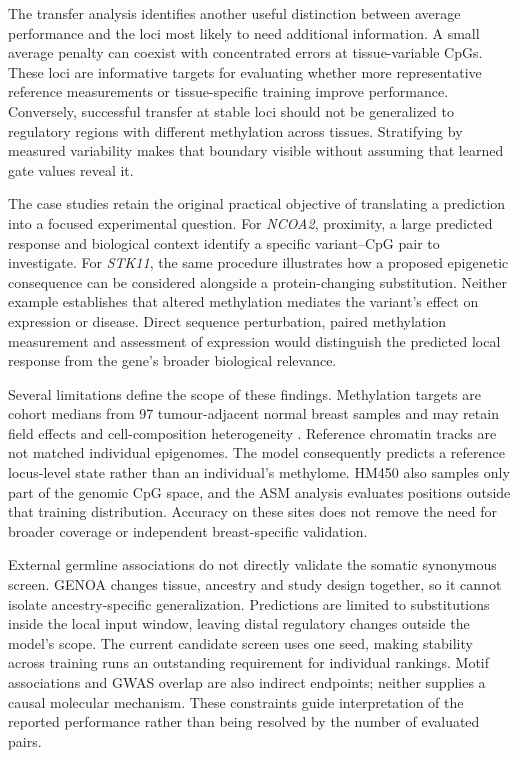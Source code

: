\documentclass[11pt,letterpaper,twocolumn]{article}
\begin{document}
The transfer analysis identifies another useful distinction between average performance and the loci most likely to need additional information. A small average penalty can coexist with concentrated errors at tissue-variable CpGs. These loci are informative targets for evaluating whether more representative reference measurements or tissue-specific training improve performance. Conversely, successful transfer at stable loci should not be generalized to regulatory regions with different methylation across tissues. Stratifying by measured variability makes that boundary visible without assuming that learned gate values reveal it.

The case studies retain the original practical objective of translating a prediction into a focused experimental question. For \textit{NCOA2}, proximity, a large predicted response and biological context identify a specific variant--CpG pair to investigate. For \textit{STK11}, the same procedure illustrates how a proposed epigenetic consequence can be considered alongside a protein-changing substitution. Neither example establishes that altered methylation mediates the variant's effect on expression or disease. Direct sequence perturbation, paired methylation measurement and assessment of expression would distinguish the predicted local response from the gene's broader biological relevance.

Several limitations define the scope of these findings. Methylation targets are cohort medians from 97 tumour-adjacent normal breast samples and may retain field effects and cell-composition heterogeneity \cite{tcga2012breast,teschendorff2016field}. Reference chromatin tracks are not matched individual epigenomes. The model consequently predicts a reference locus-level state rather than an individual's methylome. HM450 also samples only part of the genomic CpG space, and the ASM analysis evaluates positions outside that training distribution. Accuracy on these sites does not remove the need for broader coverage or independent breast-specific validation.

External germline associations do not directly validate the somatic synonymous screen. GENOA changes tissue, ancestry and study design together, so it cannot isolate ancestry-specific generalization. Predictions are limited to substitutions inside the local input window, leaving distal regulatory changes outside the model's scope. The current candidate screen uses one seed, making stability across training runs an outstanding requirement for individual rankings. Motif associations and GWAS overlap are also indirect endpoints; neither supplies a causal molecular mechanism. These constraints guide interpretation of the reported performance rather than being resolved by the number of evaluated pairs.
\end{document}
